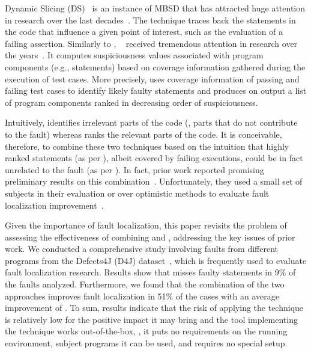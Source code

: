\documentclass{article}
\begin{document}
Dynamic Slicing (DS)~\cite{Agrawal:1990:DPS:93542.93576} is an
instance of MBSD that has attracted huge attention in research over
the last decades~\cite{Silva:2012:VPS:2187671.2187674}. The technique
traces back the statements in the code that influence a given point of
interest, such as the evaluation of a failing assertion.  Similarly to
\ds{}, \sfl{}~\cite{DBLP:journals/stvr/HarroldRSWY00} received
tremendous attention in research over the years~\cite{7390282}.  It
computes suspiciousness values associated with program components
(e.g., statements) based on coverage information gathered during the
execution of test cases.  More precisely, \sfl{} uses coverage
information of passing and failing test cases to identify likely
faulty statements and produces on output a list of program components
ranked in decreasing order of suspiciousness.


Intuitively, \ds{} identifies irrelevant parts of the code (\ie{},
parts that do not contribute to the fault) whereas \sfl{} ranks the
relevant parts of the code. It is conceivable, therefore, to combine
these two techniques based on the intuition that highly ranked
statements (as per \sfl{}), albeit covered by failing executions,
could be in fact unrelated to the fault (as per \ds{}). In fact, prior
work reported promising preliminary results on this
combination~\cite{Wotawa:2010:FLB:1848650.1849235,Alves:2011:FUD:2190078.2190115,DBLP:conf/ecai/HoferW12,lei-mao-dai-wang-2012,slicing-sfl-repair}.
Unfortunately, they used a small set of subjects in their evaluation
or over optimistic methods to evaluate fault localization
improvement~\cite{Wu:2014:CLC:2610384.2610386,Lucia:2014:FFL:2642937.2642983,Wen:2016:LLB:2970276.2970359}.

Given the importance of fault localization, this paper revisits the
problem of assessing the effectiveness of combining \ds{} and \sfl{},
addressing the key issues of prior work. We conducted a comprehensive
study involving \numFaults{} faults from \numPrograms{} different
programs from the Defects4J (D4J)
dataset~\cite{just-defects4j-issta2014}, which is frequently used to
evaluate fault localization research. Results show that \ds{} misses
faulty statements in 9\% of the \numFaults{}
faults analyzed. Furthermore, we found that the combination of the two
approaches improves fault localization in 51\% of the cases with an
average improvement of \avgImprov. To sum, results indicate that the
risk of applying the technique is relatively low for the positive
impact it may bring and the tool implementing the technique works
out-of-the-box, \ie{}, it puts no requirements on the running
environment, subject programs it can be used, and requires no special
setup.
\end{document}
